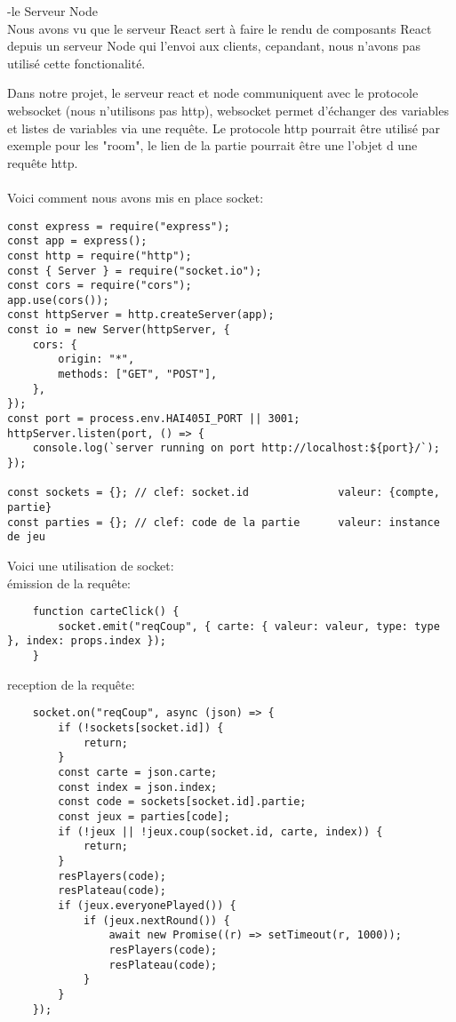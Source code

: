 \documentclass[a4paper]{article}
\begin{document}
-le Serveur Node \\

Nous avons vu que le serveur React sert à faire le rendu de composants React depuis un serveur Node qui l'envoi aux clients, cepandant, nous n'avons pas utilisé cette fonctionalité.

Dans notre projet, le serveur react et node communiquent avec le protocole websocket (nous n'utilisons pas http), websocket permet d'échanger des variables et listes de variables via une requête. Le protocole http pourrait être utilisé par exemple pour les "room", le lien de la partie pourrait être une l'objet d une requête http.\\ \\
Voici comment nous avons mis en place socket:
\begin{lstlisting}
const express = require("express");
const app = express();
const http = require("http");
const { Server } = require("socket.io");
const cors = require("cors");
app.use(cors());
const httpServer = http.createServer(app);
const io = new Server(httpServer, {
    cors: {
        origin: "*",
        methods: ["GET", "POST"],
    },
});
const port = process.env.HAI405I_PORT || 3001;
httpServer.listen(port, () => {
    console.log(`server running on port http://localhost:${port}/`);
});

const sockets = {}; // clef: socket.id              valeur: {compte, partie}
const parties = {}; // clef: code de la partie      valeur: instance de jeu

\end{lstlisting}
Voici une utilisation de socket:\\
émission de la requête:
\begin{lstlisting}
    function carteClick() {
        socket.emit("reqCoup", { carte: { valeur: valeur, type: type }, index: props.index });
    }
\end{lstlisting}
reception de la requête:
\begin{lstlisting}
    socket.on("reqCoup", async (json) => {
        if (!sockets[socket.id]) {
            return;
        }
        const carte = json.carte;
        const index = json.index;
        const code = sockets[socket.id].partie;
        const jeux = parties[code];
        if (!jeux || !jeux.coup(socket.id, carte, index)) {
            return;
        }
        resPlayers(code);
        resPlateau(code);
        if (jeux.everyonePlayed()) {
            if (jeux.nextRound()) {
                await new Promise((r) => setTimeout(r, 1000));
                resPlayers(code);
                resPlateau(code);
            }
        }
    });
\end{lstlisting}
\end{document}
